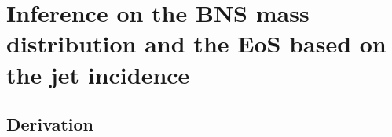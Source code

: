 \documentclass[]{aa}
\newcommand{\resp}[1]{#1}
\begin{document}


 
\section{Inference on the BNS mass distribution and the EoS based on the jet incidence}
  

\subsection{Derivation}
\label{sec:derivation}
\end{document}
